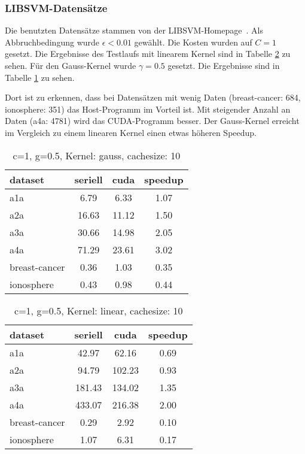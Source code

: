 \documentclass[ngerman]{scrartcl}
\begin{document}
\subsubsection{LIBSVM-Datensätze}
Die benutzten Datensätze stammen von der LIBSVM-Homepage~\cite{libsvm-data}. Als Abbruchbedingung wurde $\epsilon < 0.01$ gewählt. Die Kosten wurden auf $C=1$ gesetzt. Die Ergebnisse des Testlaufs mit linearem Kernel sind in Tabelle \ref{tbl:normal-c1-g5-linear-10} zu sehen. Für den Gauss-Kernel wurde $\gamma=0.5$ gesetzt. Die Ergebnisse sind in Tabelle \ref{tbl:normal-c1-g5-gauss-10} zu sehen.

Dort ist zu erkennen, dass bei Datensätzen mit wenig Daten (breast-cancer: 684, ionosphere: 351) das Host-Programm im Vorteil ist. Mit steigender Anzahl an Daten (a4a: 4781) wird das CUDA-Programm besser.
Der Gauss-Kernel erreicht im Vergleich zu einem linearen Kernel einen etwas höheren Speedup.

\begin{table}
\begin{center}
\begin{tabular}{|l|c|c|c|}
\hline
dataset & seriell & cuda & speedup \\
\hline
a1a & 6.79 & 6.33 & 1.07 \\
a2a & 16.63 & 11.12 & 1.50 \\
a3a & 30.66 & 14.98 & 2.05 \\
a4a & 71.29 & 23.61 & 3.02 \\
breast-cancer & 0.36 & 1.03 & 0.35 \\
ionosphere & 0.43 & 0.98 & 0.44 \\
\hline
\end{tabular}
\end{center}
\caption{ c=1, g=0.5, Kernel: gauss, cachesize: 10}
\label{tbl:normal-c1-g5-gauss-10}
\end{table}

\begin{table}
\begin{center}
\begin{tabular}{|l|c|c|c|}
\hline
dataset & seriell & cuda & speedup \\
\hline
a1a & 42.97 & 62.16 & 0.69 \\
a2a & 94.79 & 102.23 & 0.93 \\
a3a & 181.43 & 134.02 & 1.35 \\
a4a & 433.07 & 216.38 & 2.00 \\
breast-cancer & 0.29 & 2.92 & 0.10 \\
ionosphere & 1.07 & 6.31 & 0.17 \\
\hline
\end{tabular}
\end{center}
\caption{ c=1, g=0.5, Kernel: linear, cachesize: 10}
\label{tbl:normal-c1-g5-linear-10}
\end{table}
\end{document}

